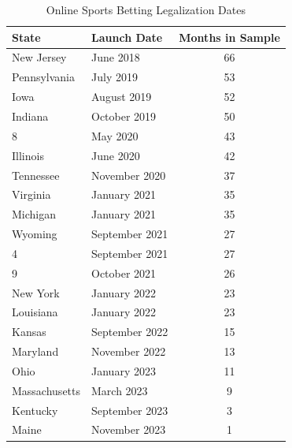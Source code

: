 \begin{table}[htbp]
\centering
\caption{Online Sports Betting Legalization Dates}
\label{tab:treatment_dates}
\begin{tabular}{llc}
\toprule
State & Launch Date & Months in Sample \\
\midrule
New Jersey & June 2018 & 66 \\
Pennsylvania & July 2019 & 53 \\
Iowa & August 2019 & 52 \\
Indiana & October 2019 & 50 \\
8 & May 2020 & 43 \\
Illinois & June 2020 & 42 \\
Tennessee & November 2020 & 37 \\
Virginia & January 2021 & 35 \\
Michigan & January 2021 & 35 \\
Wyoming & September 2021 & 27 \\
4 & September 2021 & 27 \\
9 & October 2021 & 26 \\
New York & January 2022 & 23 \\
Louisiana & January 2022 & 23 \\
Kansas & September 2022 & 15 \\
Maryland & November 2022 & 13 \\
Ohio & January 2023 & 11 \\
Massachusetts & March 2023 & 9 \\
Kentucky & September 2023 & 3 \\
Maine & November 2023 & 1 \\
\bottomrule
\end{tabular}
\end{table}

